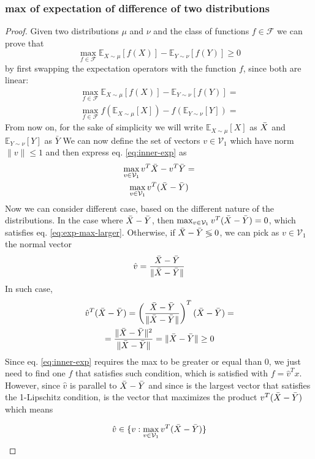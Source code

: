 \documentclass[12pt]{article}
\begin{document}
\subsubsection{max of expectation of difference of two distributions}
\begin{proof}
Given two distributions $\mu$ and $\nu$ and the class of functions $f \in \mathcal{F}$ we can prove that 
\begin{equation} \label{eq:exp-max-larger}
    \max_{f \in \mathcal{F}} \mathbb{E}_{X \sim \mu} [f(X)] -  \mathbb{E}_{Y \sim \nu} [f(Y)] \geq 0
\end{equation} \label{eq:expectation-ineq}
by first swapping the expectation operators with the function $f$, since both are linear:
\begin{gather}
    \max_{f \in \mathcal{F}} \mathbb{E}_{X \sim \mu} [f(X)] -  \mathbb{E}_{Y \sim \nu} [f(Y)] = \\
    \max_{f \in \mathcal{F}} f(\mathbb{E}_{X \sim \mu} [X]) -  f(\mathbb{E}_{Y \sim \nu} [Y]) = \label{eq:inner-exp}
\end{gather}
From now on, for the sake of simplicity we will write $\mathbb{E}_{X \sim \mu} [X]$ as $\Bar{X}$ and $\mathbb{E}_{Y \sim \nu} [Y]$ as $\bar{Y}$ We can now define the set of vectors $v \in \mathcal{V}_{1}$ which have norm $\lVert v \rVert \leq 1$ and then express eq. \ref{eq:inner-exp} as
\begin{gather}
    \max_{v \in \mathcal{V}_1} v^{T}\Bar{X} -  v^{T}\Bar{Y} = \\
    \max_{v \in \mathcal{V}_1} v^{T}(\Bar{X} - \Bar{Y}) \label{eq:momentum-difference}
\end{gather}
Now we can consider different case, based on the different nature of the distributions. In the case where $\Bar{X} - \Bar{Y}$, then $\max_{v \in \mathcal{V}_1} v^{T}(\Bar{X} - \Bar{Y}) = 0$, which satisfies eq. \ref{eq:exp-max-larger}. Otherwise, if $\Bar{X} - \Bar{Y} \lessgtr 0$, we can pick as $v \in \mathcal{V}_1$ the normal vector
\begin{equation} \label{eq:v}
    \hat{v} = \frac{\Bar{X} - \Bar{Y}}{\lVert \Bar{X} - \Bar{Y} \rVert}
\end{equation}
In such case,
\begin{gather}
    \hat{v}^{T}(\Bar{X} - \Bar{Y}) =
    \left ( \frac{\Bar{X} - \Bar{Y}}{\lVert \Bar{X} - \Bar{Y} \rVert} \right ) ^{T}(\Bar{X} - \Bar{Y}) = \\
    = \frac{\lVert \Bar{X} - \Bar{Y} \rVert ^{2}}{\lVert \Bar{X} - \Bar{Y} \rVert} = \lVert \Bar{X} - \Bar{Y} \rVert \geq 0
\end{gather}
Since eq. \ref{eq:inner-exp} requires the max to be greater or equal than 0, we just need to find one $f$ that satisfies such condition, which is satisfied with $f = \hat{v}^{T}x$. However, since $\hat{v}$ is parallel to $\Bar{X} - \Bar{Y}$ and since is the largest vector that satisfies the 1-Lipschitz condition, is the vector that maximizes the product $v^{T}(\Bar{X} - \Bar{Y})$ which means

\begin{equation}
    \hat{v} \in \{v : \max_{v \in \mathcal{V}_1} v^{T}(\Bar{X} - \Bar{Y})\}
\end{equation}
\end{proof}
\end{document}
